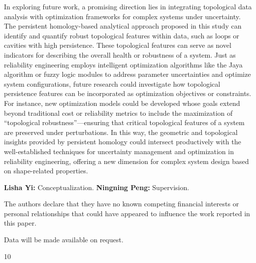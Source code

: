 \documentclass[5GeSdc,ASOC,numref,printGA,printHL,CASflow,nocrossmark,longtitle,PROOF]{/usr/local/texlive/iTemplates/01-Templates/01-Els-Jnl/01-Standard_Templates/V1/ELS_MDL5-V1-6}
\begin{document}
\begin{articlestyle}
{In exploring future work, a promising direction lies in integrating topological data analysis with optimization frameworks for complex systems under uncertainty. The persistent homology-based analytical approach proposed in this study can identify and quantify robust topological features within data, such as loops or cavities with high persistence. These topological features can serve as novel indicators for describing the overall health or robustness of a system. Just as reliability engineering employs intelligent optimization algorithms like the Jaya algorithm \cite{abed2021application} or fuzzy logic modules \cite{abed2023reliability} to address parameter uncertainties and optimize system configurations, future research could investigate how topological persistence features can be \nobreak{}incorporated as optimization objectives or constraints. For instance, new optimization models could be developed whose goals extend beyond traditional cost or reliability metrics to include the maximization of ``topological robustness''---ensuring that critical topological features of a system are preserved under perturbations. In this way, the geometric and topological insights provided by persistent homology could intersect productively with the well-established techniques for uncertainty management and optimization in reliability engineering, offering a new dimension for complex system design based on shape-related properties.
}




\backmatter

\begin{aucontrib}
\textbf{Lisha Yi:} Conceptualization. 
\textbf{Ningning Peng:} Supervision. 
\end{aucontrib}

\begin{COI}
The authors declare that they have no known competing financial interests or personal relationships that could have appeared to influence the work reported in this paper.
\end{COI}

\begin{dataavail}
Data will be made available on request.
\end{dataavail}

\begin{thebibliography}{10}









\end{thebibliography}
\end{articlestyle}
\end{document}
